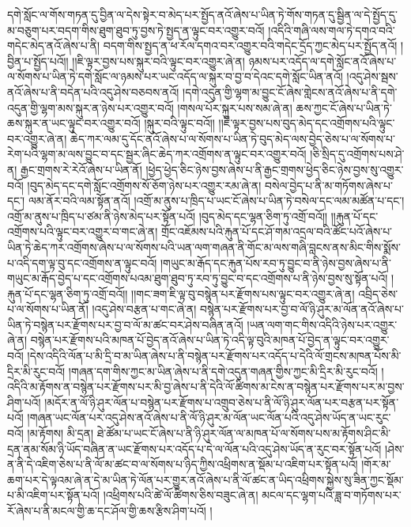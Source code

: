 དགེ་སློང་ལ་གོས་གཏན་དུ་བྱིན་ལ་དེས་སྟེར་བ་མེད་པར་སྤྱོད་ནའོ་ཞེས་པ་ཡིན་ཏེ་གོས་གཏན་དུ་སྦྱིན་ལ་དེ་སྤྱོད་དུ་མ་བཅུག་པར་བདག་གིས་ཐུག་ཐུབ་ཏུ་བྱས་ཏེ་སྤྱད་ན་ལྟུང་བར་འགྱུར་བའོ། །འདིའི་གཞི་ལས་གལ་ཏེ་དགའ་བའི་གདེང་མེད་ནའོ་ཞེས་པ་ནི། བདག་གིས་སྤྱད་ན་ཕ་རོལ་དགའ་བར་འགྱུར་བའི་གདེང་དྲོད་ཀྱང་མེད་པར་སྤྱོད་ནའོ། །བྱིན་པ་སྤྱོད་པའོ།། །།ཇི་ལྟར་བྱས་པས་སྐུར་བའི་ལྟུང་བར་འགྱུར་ཞེ་ན། ཉམས་པར་འདོད་ལ་དགེ་སློང་ནའོ་ཞེས་པ་ལ་སོགས་པ་ཡིན་ཏེ་དགེ་སློང་ལ་ཉམས་པར་ཡང་འདོད་ལ་སྐུར་བ་བྱ་བ་དེའང་དགེ་སློང་ཡིན་ནའོ། །འདུ་ཤེས་སྦས་ནའོ་ཞེས་པ་ནི་བདེན་པའི་འདུ་ཤེས་བཅབས་ནའོ། །དགེ་འདུན་གྱི་ལྷག་མ་བྱུང་ངོ་ཞེས་གླེངས་ནའོ་ཞེས་པ་ནི་དགེ་འདུན་གྱི་ལྷག་མས་སྐུར་ན་ཉེས་པར་འགྱུར་བའོ། །གསལ་པོར་སྐུར་པས་སམ་ཞེ་ན། ཆས་ཀྱང་ངོ་ཞེས་པ་ཡིན་ཏེ་ཆས་སྐུར་ན་ཡང་ལྟུང་བར་འགྱུར་བའོ། །སྐུར་བའི་ལྟུང་བའོ།། །།ཇི་ལྟར་བྱས་པས་བུད་མེད་དང་འགྲོགས་པའི་ལྟུང་བར་འགྱུར་ཞེ་ན། ཆེད་ཀར་ལམ་དུ་དོང་ནའོ་ཞེས་པ་ལ་སོགས་པ་ཡིན་ཏེ་བུད་མེད་ལས་བྱེད་ཅེས་པ་ལ་སོགས་པ་རེག་པའི་ལྷག་མ་ལས་བྱུང་བ་དང་སྦྱར་ཞིང་ཆེད་ཀར་འགྲོགས་ན་ལྟུང་བར་འགྱུར་བའོ། །ཅི་སྲིད་དུ་འགྲོགས་པས་ཤེ་ན། རྒྱང་གྲགས་རེ་རེའོ་ཞེས་པ་ཡིན་ནོ། །ཕྱེད་ཕྱེད་ཅིང་ཉེས་བྱས་ཞེས་པ་ནི་རྒྱང་གྲགས་ཕྱེད་ཅིང་ཉེས་བྱས་སུ་འགྱུར་བའོ། །བུད་མེད་དང་དགེ་སློང་འགྲོགས་སོ་ཅོག་ཉེས་པར་འགྱུར་རམ་ཞེ་ན། བསེལ་བྱེད་པ་ནི་མ་གཏོགས་ཞེས་པ་དང་། ལམ་ནོར་བའི་ལམ་སྟོན་ནའོ། །འགྲོ་མ་ནུས་པ་ཁྲིད་པ་ཡང་ངོ་ཞེས་པ་ཡིན་ཏེ་བསེལ་དང་ལམ་མཚོན་པ་དང་། འགྲོ་མ་ནུས་པ་ཁྲིད་པ་ཙམ་ནི་ཉེས་མེད་པར་སྟོན་པའོ། །བུད་མེད་དང་ལྷན་ཅིག་ཏུ་འགྲོ་བའོ།། །།རྐུན་པོ་དང་འགྲོགས་པའི་ལྟུང་བར་འགྱུར་བ་གང་ཞེ་ན། གྲོང་འཇོམས་པའི་རྐུན་པོ་དང་ཤོ་གམ་འདྲལ་བའི་ཚོང་པའོ་ཞེས་པ་ཡིན་ཏེ་ཆེད་ཀར་འགྲོགས་ཞེས་པ་ལ་སོགས་པའི་ཡན་ལག་གཞན་ནི་གོང་མ་ལས་གཞི་བླངས་ནས་མིང་གིས་སྨོས་པ་འདི་དག་ལྟ་བུ་དང་འགྲོགས་ན་ལྟུང་བའོ། །གཡུང་མ་རྒོད་དང་རྐུན་པོས་རབ་ཏུ་བྱུང་བ་ནི་ཉེས་བྱས་ཞེས་པ་ནི་གཡུང་མ་རྒོད་བྱེད་པ་དང་འགྲོགས་པའམ་ཐུག་ཐུབ་ཏུ་རབ་ཏུ་བྱུང་བ་དང་འགྲོགས་པ་ནི་ཉེས་བྱས་སུ་སྟོན་པའོ། །རྐུན་པོ་དང་ལྷན་ཅིག་ཏུ་འགྲོ་བའོ།། །།གང་ཟག་ཇི་ལྟ་བུ་བསྙེན་པར་རྫོགས་པས་ལྟུང་བར་འགྱུར་ཞེ་ན། འབྲིད་ཅེས་པ་ལ་སོགས་པ་ཡིན་ནོ། །འདུ་ཤེས་བརྩན་པ་གང་ཞེ་ན། བསྙེན་པར་རྫོགས་པར་བྱ་བ་ལོ་ཉི་ཤུར་མ་ལོན་ནའོ་ཞེས་པ་ཡིན་ཏེ་བསྙེན་པར་རྫོགས་པར་བྱ་བ་ལོ་མ་ཚང་བར་ཤེས་བཞིན་ནའོ། །ཡན་ལག་གང་གིས་འདིའི་ཉེས་པར་འགྱུར་ཞེ་ན། བསྙེན་པར་རྫོགས་པའི་མཁན་པོ་བྱེད་ནའོ་ཞེས་པ་ཡིན་ཏེ་འདི་ལྟ་བུའི་མཁན་པོ་བྱེད་ན་ལྟུང་བར་འགྱུར་བའོ། །དེས་འདིའི་ལོན་པ་མི་དྲི་བ་མ་ཡིན་ཞེས་པ་ནི་བསྙེན་པར་རྫོགས་པར་འདོད་པ་དེའི་ལོ་གྲངས་མཁན་པོས་མི་དྲིར་མི་རུང་བའོ། །གཞན་དག་གིས་ཀྱང་མ་ཡིན་ཞེས་པ་ནི་དགེ་འདུན་གཞན་གྱིས་ཀྱང་མི་དྲིར་མི་རུང་བའོ། །འདིའི་མ་རྟོགས་ན་བསྙེན་པར་རྫོགས་པར་མི་བྱ་ཞེས་པ་ནི་དེའི་ལོ་ཚིགས་མ་ངེས་ན་བསྙེན་པར་རྫོགས་པར་མ་བྱས་ཤིག་པའོ། །མདོར་ན་ལོ་ཉི་ཤུར་ལོན་པ་བསྙེན་པར་རྫོགས་པ་འགྲུབ་ཅེས་པ་ནི་ལོ་ཉི་ཤུར་ལོན་པར་བརྩན་པར་སྟོན་པའོ། །གཞན་ཡང་ལོན་པར་འདུ་ཤེས་ནའོ་ཞེས་པ་ནི་ལོ་ཉི་ཤུར་མ་ལོན་ཡང་ལོན་པའི་འདུ་ཤེས་ཡོད་ན་ཡང་རུང་བའོ། །མ་རྟོགས། མི་དྲན། ཐེ་ཚོམ་པ་ཡང་ངོ་ཞེས་པ་ནི་ཉི་ཤུར་ལོན་ལ་མཁན་པོ་ལ་སོགས་པས་མ་རྟོགས་ཤིང་མི་དྲན་ནམ་སོམ་ཉི་ཡོད་བཞིན་ན་ཡང་རྫོགས་པར་འདོད་པ་དེ་ལ་ལོན་པའི་འདུ་ཤེས་ཡོད་ན་རུང་བར་སྟོན་པའོ། །ཤེས་ན་ནི་དེ་འཇིག་ཅེས་པ་ནི་ལོ་མ་ཚང་བ་ལ་སོགས་པ་ཉིད་ཀྱིས་འཕྲིགས་ན་སྡོམ་པ་འཇིག་པར་སྟོན་པའོ། །གོར་མ་ཆག་པར་དེ་ལྟའམ་ཞེ་ན་དེ་མ་ཡིན་ཏེ་ལོན་པར་གྱུར་ནའོ་ཞེས་པ་ནི་ལོ་ཚང་ན་ཡིད་འཕྲིགས་སྐྱེས་སུ་ཟིན་ཀྱང་སྡོམ་པ་མི་འཇིག་པར་སྟོན་པའོ། །འཕྲིགས་པའི་ཚེ་ལོ་ཚིགས་ཅིས་བཟུང་ཞེ་ན། མངལ་དང་ལྷག་པའི་ཟླ་བ་གཏོགས་པར་རོ་ཞེས་པ་ནི་མངལ་གྱི་ཆ་དང་ཤོལ་གྱི་ཆས་རྩིས་ཤིག་པའོ། །
